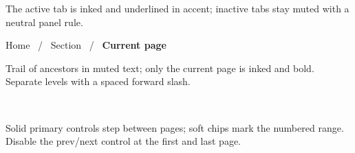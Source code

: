 \vspace{2mm}
{\small\color{muted} The active tab is inked and underlined in accent; inactive
tabs stay muted with a neutral panel rule.}

\vspace{5mm}

{\color{muted}Home} \ / \ {\color{muted}Section} \ / \ {\color{ink}\textbf{Current page}}

\vspace{2mm}
{\small\color{muted} Trail of ancestors in muted text; only the current page is
inked and bold. Separate levels with a spaced forward slash.}

\vspace{5mm}

\uibtnsm[primary]{<}\ \ \ \ \uibtnsm[primary]{>}

\vspace{2mm}
{\small\color{muted} Solid primary controls step between pages; soft chips mark
the numbered range. Disable the prev/next control at the first and last page.}

\clearpage
